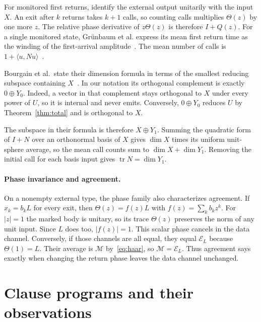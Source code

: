 \documentclass[acmsmall,screen,review,anonymous,nonacm]{acmart}
\renewcommand{\textfraction}{.1}
\renewcommand{\floatpagefraction}{.75}
\newcommand{\tr}{\operatorname{tr}}
\numberwithin{equation}{section}
\newcommand{\chan}[1]{\mathcal E_{#1}}
\newcommand{\meas}{\mathcal M}
\begin{document}
For monitored first returns, identify the external output unitarily with
the input $X$. An exit after $k$ returns takes $k+1$ calls, so counting
calls multiplies $\Theta(z)$ by one more $z$. The relative phase derivative
of $z\Theta(z)$ is therefore $I+Q(z)$. For a single monitored state,
Gr\"unbaum et al. express its mean first return time as the winding of the
first-arrival amplitude~\cite[\S~4, proof of Thm.~2]{Grunbaum13Recurrence}. The mean number of calls is
$1+\langle u,Nu\rangle$~\cite[\S~3, Eq.~(8)]{Bourgain14Subspace}.

Bourgain et al.\ state their dimension formula in terms of the smallest
reducing subspace containing $X$~\cite[Thm.~3.2, Eq.~(9)]{Bourgain14Subspace}.
In our notation its orthogonal complement is exactly $0\oplus Y_0$.
Indeed, a vector in that complement stays orthogonal to $X$ under every
power of $U$, so it is internal and never emits. Conversely, $0\oplus Y_0$
reduces $U$ by Theorem~\ref{thm:total} and is orthogonal to $X$.

The subspace in their formula is therefore $X\oplus Y_1$. Summing the
quadratic form of $I+N$ over an orthonormal basis of $X$ gives $\dim X$
times its uniform unit-sphere average, so the mean call counts sum to
$\dim X+\dim Y_1$. Removing the initial call for each basis input gives
$\tr N=\dim Y_1$.

\paragraph{Phase invariance and agreement.}
On a nonempty external type, the phase family also characterizes
agreement. If $x_k=b_kL$ for every exit, then
$\Theta(z)=f(z)L$ with $f(z)=\sum_k b_kz^k$. For $|z|=1$ the marked
body is unitary, so its trace $\Theta(z)$ preserves the norm of any
unit input. Since $L$ does too, $|f(z)|=1$. This scalar phase cancels
in the data channel. Conversely, if those channels are
all equal, they equal $\chan L$ because $\Theta(1)=L$. Their average
is $\meas$ by~\eqref{eq:haar}, so
$\meas=\chan L$.
Thus agreement says exactly when changing the return phase leaves the
data channel unchanged.

\setcounter{topnumber}{6}
\setcounter{bottomnumber}{5}
\setcounter{totalnumber}{8}
\renewcommand{\floatpagefraction}{.88}
\renewcommand{\textfraction}{.05}
\section{Clause programs and their observations}\label{app:programs}
\end{document}
